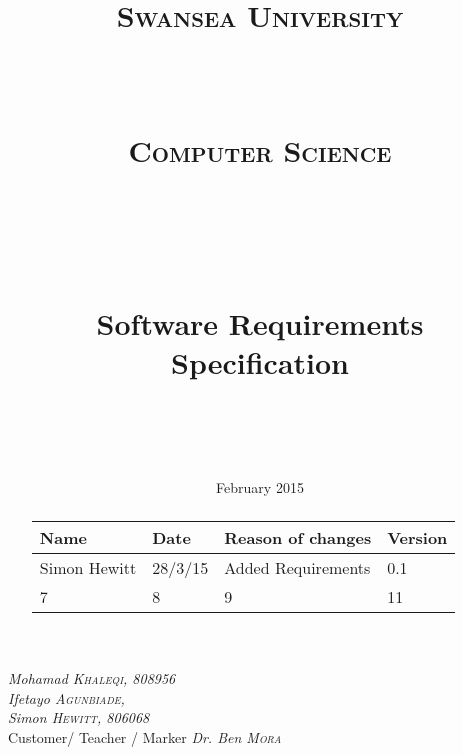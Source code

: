 \documentclass[a4paper,10pt]{article}
\title{	
\normalfont \normalsize 
\begin{LARGE} \textsc{Swansea University} \end{LARGE} \\ [15pt] %
\begin{large} \textsc{Computer Science} \end{large} \\ [15pt] %
\vspace{50px}
\horrule{0.5pt} \\[0.4cm] %
\begin{Huge}Software Requirements Specification \end{Huge}%
\horrule{2pt} \\[0.5cm] %
}
\author{} %
\date{} %
\begin{document}
\begin{titlepage}
\maketitle
\vspace{50px}
\begin{flushleft}
  \textit{Mohamad \textsc{Khaleqi}, 808956} \\
  \textit{Ifetayo \textsc{Agunbiade}, } \\
 \textit{Simon \textsc{Hewitt}, 806068} \\
  \hfill Customer/ Teacher / Marker \textit{Dr. Ben \textsc{Mora}}
\end{flushleft}

\vfill
\center \date{\normalsize February 2015} %

\end{titlepage}
\pagebreak
{} %
\tableofcontents
\pagebreak
\justify

\renewcommand{\abstractname}{Revision History}
\begin{abstract}
\begin{center}
  \begin{tabular}{ |  p{3cm} | p{3cm} |  p{5cm} | p{2cm} |}
    \hline
    Name & Date & Reason of changes & Version \\ \hline \hline
    Simon Hewitt & 28/3/15 & Added Requirements & 0.1 \\ \hline 
    7 & 8 & 9 & 11 \\
    \hline
  \end{tabular}
\end{center}
\end{abstract}


\setlength{\parindent}{0cm}

\end{document}
